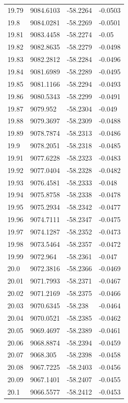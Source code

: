 \begin{table}[H]
\begin{tabular}{llll}
19.79 & 9084.6103 & -58.2264 & -0.0503 \\
19.8 & 9084.0281 & -58.2269 & -0.0501 \\
19.81 & 9083.4458 & -58.2274 & -0.05 \\
19.82 & 9082.8635 & -58.2279 & -0.0498 \\
19.83 & 9082.2812 & -58.2284 & -0.0496 \\
19.84 & 9081.6989 & -58.2289 & -0.0495 \\
19.85 & 9081.1166 & -58.2294 & -0.0493 \\
19.86 & 9080.5343 & -58.2299 & -0.0491 \\
19.87 & 9079.952 & -58.2304 & -0.049 \\
19.88 & 9079.3697 & -58.2309 & -0.0488 \\
19.89 & 9078.7874 & -58.2313 & -0.0486 \\
19.9 & 9078.2051 & -58.2318 & -0.0485 \\
19.91 & 9077.6228 & -58.2323 & -0.0483 \\
19.92 & 9077.0404 & -58.2328 & -0.0482 \\
19.93 & 9076.4581 & -58.2333 & -0.048 \\
19.94 & 9075.8758 & -58.2338 & -0.0478 \\
19.95 & 9075.2934 & -58.2342 & -0.0477 \\
19.96 & 9074.7111 & -58.2347 & -0.0475 \\
19.97 & 9074.1287 & -58.2352 & -0.0473 \\
19.98 & 9073.5464 & -58.2357 & -0.0472 \\
19.99 & 9072.964 & -58.2361 & -0.047 \\
20.0 & 9072.3816 & -58.2366 & -0.0469 \\
20.01 & 9071.7993 & -58.2371 & -0.0467 \\
20.02 & 9071.2169 & -58.2375 & -0.0466 \\
20.03 & 9070.6345 & -58.238 & -0.0464 \\
20.04 & 9070.0521 & -58.2385 & -0.0462 \\
20.05 & 9069.4697 & -58.2389 & -0.0461 \\
20.06 & 9068.8874 & -58.2394 & -0.0459 \\
20.07 & 9068.305 & -58.2398 & -0.0458 \\
20.08 & 9067.7225 & -58.2403 & -0.0456 \\
20.09 & 9067.1401 & -58.2407 & -0.0455 \\
20.1 & 9066.5577 & -58.2412 & -0.0453 \\

\end{tabular}
\end{table}
